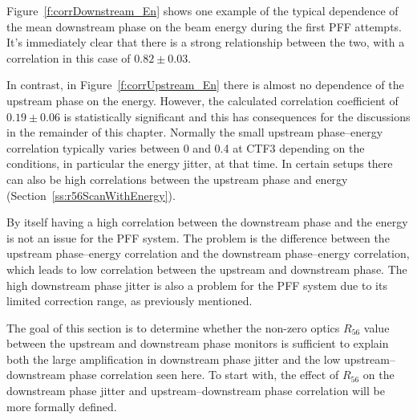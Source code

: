 Figure~\ref{f:corrDownstream_En} shows one example of the typical dependence of the mean downstream phase on the beam energy during the first PFF attempts. It's immediately clear that there is a strong relationship between the two, with a correlation in this case of \(0.82\pm0.03\). 

In contrast, in Figure~\ref{f:corrUpstream_En} there is almost no dependence of the upstream phase on the energy. However, the calculated correlation coefficient of \(0.19\pm0.06\) is statistically significant and this has consequences for the discussions in the remainder of this chapter. Normally the small upstream phase--energy correlation typically varies between 0 and 0.4 at CTF3 depending on the conditions, in particular the energy jitter, at that time. In certain setups there can also be high correlations between the upstream phase and energy (Section~\ref{ss:r56ScanWithEnergy}).

By itself having a high correlation between the downstream phase and the energy is not an issue for the PFF system. The problem is the difference between the upstream phase--energy correlation and the downstream phase--energy correlation, which leads to low correlation between the upstream and downstream phase. The high downstream phase jitter is also a problem for the PFF system due to its limited correction range, as previously mentioned.

The goal of this section is to determine whether the non-zero optics \(R_{56}\) value between the upstream and downstream phase monitors is sufficient to explain both the large amplification in downstream phase jitter and the low upstream--downstream phase correlation seen here. To start with, the effect of \(R_{56}\) on the downstream phase jitter and upstream--downstream phase correlation will be more formally defined.

